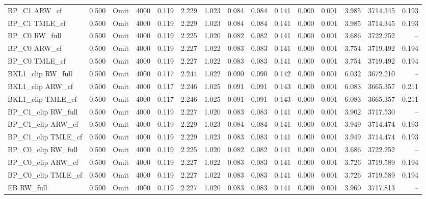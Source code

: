 \begin{tabular}{llllrrrrrrrrrrr}
BP\_C1 ARW\_cf & 0.500 & Omit & 4000 & 0.119 & 2.229 & 1.023 & 0.084 & 0.084 & 0.141 & 0.000 & 0.001 & 3.985 & 3714.345 & 0.193 \\
BP\_C1 TMLE\_cf & 0.500 & Omit & 4000 & 0.119 & 2.229 & 1.023 & 0.084 & 0.084 & 0.141 & 0.000 & 0.001 & 3.985 & 3714.345 & 0.193 \\
BP\_C0 RW\_full & 0.500 & Omit & 4000 & 0.119 & 2.225 & 1.020 & 0.082 & 0.082 & 0.141 & 0.000 & 0.001 & 3.686 & 3722.252 & -- \\
BP\_C0 ARW\_cf & 0.500 & Omit & 4000 & 0.119 & 2.227 & 1.022 & 0.083 & 0.083 & 0.141 & 0.000 & 0.001 & 3.754 & 3719.492 & 0.194 \\
BP\_C0 TMLE\_cf & 0.500 & Omit & 4000 & 0.119 & 2.227 & 1.022 & 0.083 & 0.083 & 0.141 & 0.000 & 0.001 & 3.754 & 3719.492 & 0.194 \\
BKL1\_clip RW\_full & 0.500 & Omit & 4000 & 0.117 & 2.244 & 1.022 & 0.090 & 0.090 & 0.142 & 0.000 & 0.001 & 6.032 & 3672.210 & -- \\
BKL1\_clip ARW\_cf & 0.500 & Omit & 4000 & 0.117 & 2.246 & 1.025 & 0.091 & 0.091 & 0.143 & 0.000 & 0.001 & 6.083 & 3665.357 & 0.211 \\
BKL1\_clip TMLE\_cf & 0.500 & Omit & 4000 & 0.117 & 2.246 & 1.025 & 0.091 & 0.091 & 0.143 & 0.000 & 0.001 & 6.083 & 3665.357 & 0.211 \\
BP\_C1\_clip RW\_full & 0.500 & Omit & 4000 & 0.119 & 2.227 & 1.020 & 0.083 & 0.083 & 0.141 & 0.000 & 0.001 & 3.902 & 3717.530 & -- \\
BP\_C1\_clip ARW\_cf & 0.500 & Omit & 4000 & 0.119 & 2.229 & 1.023 & 0.084 & 0.084 & 0.141 & 0.000 & 0.001 & 3.949 & 3714.474 & 0.193 \\
BP\_C1\_clip TMLE\_cf & 0.500 & Omit & 4000 & 0.119 & 2.229 & 1.023 & 0.083 & 0.083 & 0.141 & 0.000 & 0.001 & 3.949 & 3714.474 & 0.193 \\
BP\_C0\_clip RW\_full & 0.500 & Omit & 4000 & 0.119 & 2.225 & 1.020 & 0.082 & 0.082 & 0.141 & 0.000 & 0.001 & 3.686 & 3722.252 & -- \\
BP\_C0\_clip ARW\_cf & 0.500 & Omit & 4000 & 0.119 & 2.227 & 1.022 & 0.083 & 0.083 & 0.141 & 0.000 & 0.001 & 3.726 & 3719.589 & 0.194 \\
BP\_C0\_clip TMLE\_cf & 0.500 & Omit & 4000 & 0.119 & 2.227 & 1.022 & 0.083 & 0.083 & 0.141 & 0.000 & 0.001 & 3.726 & 3719.589 & 0.194 \\
EB RW\_full & 0.500 & Omit & 4000 & 0.119 & 2.227 & 1.020 & 0.083 & 0.083 & 0.141 & 0.000 & 0.001 & 3.960 & 3717.813 & -- \\

\end{tabular}

